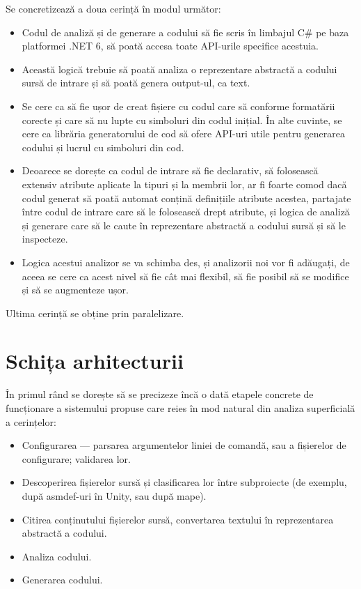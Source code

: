 \documentclass[a4paper,12pt]{report}
\begin{document}
Se concretizează a doua cerință în modul următor:

\begin{itemize}
  \item Codul de analiză și de generare a codului să fie scris în limbajul C\# pe baza platformei {{.}NET} 6, să poată accesa toate \ac{API}-urile specifice acestuia.
  \item Această logică trebuie să poată analiza o reprezentare abstractă a codului sursă de intrare și să poată genera output-ul, ca text.
  \item Se cere ca să fie ușor de creat fișiere cu codul care să conforme formatării corecte și care să nu lupte cu simboluri din codul inițial.
  În alte cuvinte, se cere ca librăria generatorului de cod să ofere \ac{API}-uri utile pentru generarea codului și lucrul cu simboluri din cod.
  \item Deoarece se dorește ca codul de intrare să fie declarativ, să folosească extensiv atribute aplicate la tipuri și la membrii lor, ar fi foarte
  comod dacă codul generat să poată automat conțină definițiile atribute acestea, partajate între codul de intrare care să le folosească drept atribute,
  și logica de analiză și generare care să le caute în reprezentare abstractă a codului sursă și să le inspecteze.
  \item Logica acestui analizor se va schimba des, și analizorii noi vor fi adăugați, de aceea se cere ca acest nivel să fie cât mai flexibil, să fie posibil să se modifice și să se augmenteze ușor.
\end{itemize}


Ultima cerință se obține prin paralelizare.

\section{Schița arhitecturii}

În primul rând se dorește să se precizeze încă o dată etapele concrete de funcționare a sistemului propuse care reies în mod natural din analiza superficială a cerințelor:

\begin{itemize}
\item Configurarea --- parsarea argumentelor liniei de comandă, sau a fișierelor de configurare; validarea lor.
\item Descoperirea fișierelor sursă și clasificarea lor între subproiecte (de exemplu, după asmdef-uri în Unity, sau după mape).
\item Citirea conținutului fișierelor sursă, convertarea textului în reprezentarea abstractă a codului.
\item Analiza codului.
\item Generarea codului.
\end{itemize}
\end{document}
